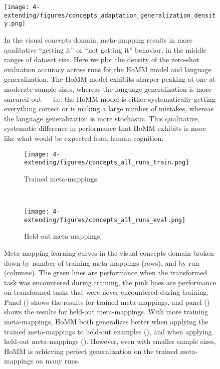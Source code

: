 \begin{figure}[H]
\centering
\texttt{[image: 4-extending/figures/concepts\_adaptation\_generalization\_density.png]}
\caption[Visual concept generalization densities.]{In the visual concepts domain, meta-mapping results in more qualitative ``getting it'' or ``not getting it'' behavior, in the middle ranges of dataset size. Here we plot the density of the zero-shot evaluation accuracy across runs for the HoMM model and language generalization. The HoMM model exhibits sharper peaking at one at moderate sample sizes, whereas the language generalization is more smeared out --- i.e. the HoMM model is either systematically getting everything correct or is making a large number of mistakes, whereas the language generalization is more stochastic. This qualitative, systematic difference in performance that HoMM exhibits is more like what would be expected from human cognition.}\label{fig:app_extending:concepts_generalization_density}
\end{figure}

\begin{figure}[p]
\centering
\begin{subfigure}{\textwidth}
\centering
\texttt{[image: 4-extending/figures/concepts\_all\_runs\_train.png]}
\caption{Trained meta-mappings.}\label{fig:app_extending:concepts_all_runs:train}
\end{subfigure}\\
\begin{subfigure}{\textwidth}
\centering
\texttt{[image: 4-extending/figures/concepts\_all\_runs\_eval.png]}
\caption{Held-out meta-mappings.}\label{fig:app_extending:concepts_all_runs:eval}
\end{subfigure}
\caption[Visual concept learning curves by run.]{Meta-mapping learning curves in the visual concepts domain broken down by number of training meta-mappings (rows), and by run (columns). The green lines are performance when the transformed task was encountered during training, the pink lines are performance on transformed tasks that were never encountered during training. Panel () shows the results for trained meta-mappings, and panel () shows the results for held-out meta-mappings. With more training meta-mappings, HoMM both generalizes better when applying the trained meta-mappings to held-out examples (), and when applying held-out meta-mappings (). However, even with smaller sample sizes, HoMM is achieving perfect generalization on the trained meta-mappings on many runs.} \label{fig:app_extending:concepts_all_runs}
\end{figure}

